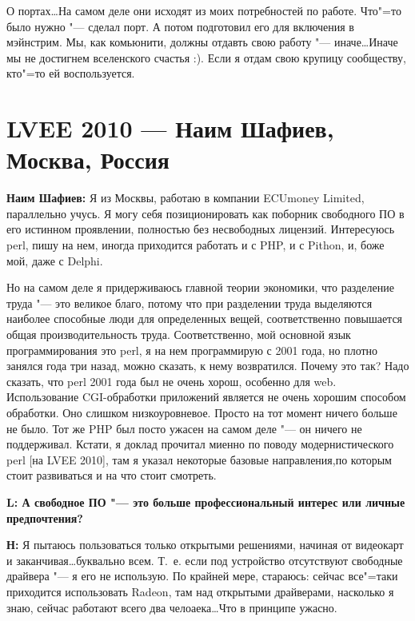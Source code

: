 \documentclass[10pt, a5paper]{article}
\begin{document}
О портах\ldots На самом деле они исходят из моих потребностей по работе. Что"=то было нужно "--- сделал порт. А потом подготовил его для включения в мэйнстрим. Мы, как комьюнити, должны отдавть свою работу "--- иначе\ldots Иначе мы не достигнем вселенского счастья :). Если я отдам свою крупицу сообществу, кто"=то ей воспользуется.

\section*{\flushleft LVEE 2010 --- Наим Шафиев, \linebreak Москва, Россия}


{\noindent \bf Наим Шафиев:} Я из Москвы, работаю в компании ECUmoney Limited, параллельно учусь. Я могу себя позиционировать как поборник свободного ПО в его истинном проявлении, полностью без несвободных лицензий. Интересуюсь perl, пишу на нем, иногда приходится работать и с PHP, и с Pithon, и, боже мой, даже с Delphi. 

Но на самом деле я придерживаюсь главной теории экономики, что разделение труда "--- это великое благо, потому что при разделении труда выделяются наиболее способные люди для определенных вещей, соответственно повышается общая производительность труда. Соответственно, мой основной язык программирования это perl, я на нем программирую с 2001 года, но плотно занялся года три назад, можно сказать, к нему возвратился. Почему это так? Надо сказать, что perl 2001 года был не очень хорош, особенно для web. Использование CGI-обработки приложений является не очень хорошим способом обработки. Оно слишком низкоуровневое. Просто на тот момент ничего больше не было. Тот же PHP был посто ужасен на самом деле "--- он ничего не поддерживал. Кстати, я доклад прочитал миенно по поводу модернистического perl [на LVEE 2010], там я указал некоторые базовые направления,по которым стоит развиваться и на что стоит смотреть.

{\noindent \bf L: А свободное ПО "--- это больше профессиональный интерес или личные предпочтения?}

{\noindent \bf Н:} Я пытаюсь пользоваться только открытыми решениями, начиная от видеокарт и заканчивая\ldots буквально всем. Т.~е. если под устройство отсутствуют свободные драйвера "--- я его не использую. По крайней мере, стараюсь: сейчас все"=таки приходится использовать Radeon, там над открытыми драйверами, насколько я знаю, сейчас работают всего два челоаека\ldots Что в принципе ужасно. 
\end{document}
